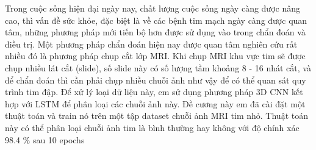 
Trong cuộc sống hiện đại ngày nay, chất lượng cuộc sống ngày càng được nâng cao, thì vấn đề sức khỏe, đặc biệt là về các bệnh tim mạch ngày càng được quan tâm, những phương pháp mới tiến bộ hơn được sử dụng vào trong chẩn đoán và điều trị. Một phương pháp chẩn đoán hiện nay được quan tâm nghiên cứu rất nhiều đó là phương pháp chụp cắt lớp MRI. Khi chụp MRI khu vực tim sẽ được chụp nhiều lát cắt (slide), số slide này có số lượng tầm khoảng 8 - 16 nhát cắt, và để chẩn đoán thì cần phải chụp nhiều chuỗi ảnh như vậy để có thể quan sát quy trình tim đập. Để xử lý loại dữ liệu này, em sử dụng phương pháp 3D CNN kết hợp với LSTM để phân loại các chuỗi ảnh này. Đề cương này em đã cài đặt một thuật toán và train nó trên một tập dataset chuỗi ảnh MRI tim nhỏ. Thuật toán này có thể phân loại chuỗi ảnh tim là bình thường hay không với độ chính xác 98.4 \% sau 10 epochs

